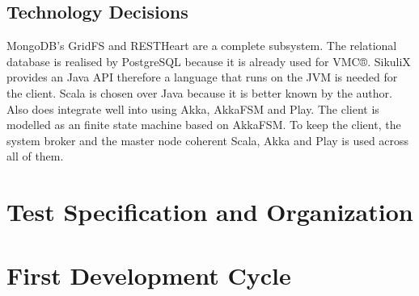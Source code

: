 \documentclass[a4paper,twocolumn]{article}
\newcommand{\VMC}[0]{VMC®}
\begin{document}
\subsection{Technology Decisions}

MongoDB's GridFS and RESTHeart are a complete subsystem.
The relational database is realised by PostgreSQL\cite{PostgreSQL} because it is already used for \VMC{}.
SikuliX provides an Java API therefore a language that runs on the JVM is needed for the client.
Scala is chosen over Java because it is better known by the author.
Also does integrate well into using Akka\cite{Akka}, AkkaFSM\cite{AkkaFSM} and Play\cite{Play}.
The client is modelled as an finite state machine based on AkkaFSM.
To keep the client, the system broker and the master node coherent Scala, Akka and Play is used across all of them.


\section{Test Specification and Organization}

\section{First Development Cycle}



\printbibliography[notkeyword=software]
\printbibliography[keyword=software,title={Used software}]
\end{document}
